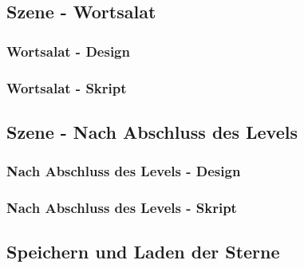 \subsection{Szene - Wortsalat}
\subsubsection{Wortsalat - Design}
\subsubsection{Wortsalat - Skript}
\subsection{Szene - Nach Abschluss des Levels}
\subsubsection{Nach Abschluss des Levels - Design}
\subsubsection{Nach Abschluss des Levels - Skript}
\subsection{Speichern und Laden der Sterne}
